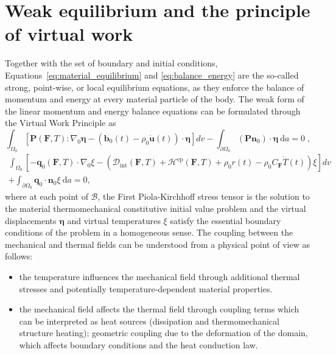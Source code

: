 \section{Weak equilibrium and the principle of virtual work}

Together with the set of boundary and initial conditions, Equations~\eqref{eq:material_equilibrium} and \eqref{eq:balance_energy} are the so-called strong, point-wise, or local equilibrium equations, as they enforce the balance of momentum and energy at every material particle of the body.
The weak form of the linear momentum and energy balance equations can be formulated through the Virtual Work Principle as
\begin{equation} \label{eq:weak_momentum_balance}
  \int_{\Omega_0} [\bm{P}(\bm{F},T):\nabla_0 \bm{\eta} - (\bm{b}_0(t)-\rho_0\ddot{\bm{u}}(t))\cdot \bm{\eta}]d v - \int_{\partial\Omega_0} (\bm{P}\bm{n}_{0})\cdot \bm{\eta} \ \mathrm{d} a = 0\;,
\end{equation}
\begin{multline} \label{eq:weak_energy_balance}
  \int_{\Omega_0}   \left[-\bm{q}_{0}(\bm{F},T)\cdot \nabla_0 \xi - \left(\mathcal D_\text{int}(\bm{F},T)+\mathcal H^\text{ep}(\bm{F},T)+ \rho_0 r(t)-\rho_0 C_{\bm F}\dot T(t)\right) \xi\right]d v\\ + \int_{\partial\Omega_0} \bm{q}_{0}\cdot \bm{n}_{0} \xi \ \mathrm{d} a = 0,
\end{multline}
where at each point of $\mathscr{B}$, the First Piola-Kirchhoff stress tensor is the solution to the material thermomechanical constitutive initial value problem and the virtual displacements \(\bm{\eta}\) and virtual temperatures \(\xi\) satisfy the essential boundary conditions of the problem in a homogeneous sense.
The coupling between the mechanical and thermal fields can be understood from a physical point of view as follows:
\begin{itemize}
\item the temperature influences the mechanical field through additional thermal stresses and potentially temperature-dependent material properties.
\item  the mechanical field affects the thermal field through coupling terms which can be interpreted as heat sources (dissipation and thermomechanical structure heating); geometric coupling due to the deformation of the domain, which affects boundary conditions and the heat conduction law.
\end{itemize}

